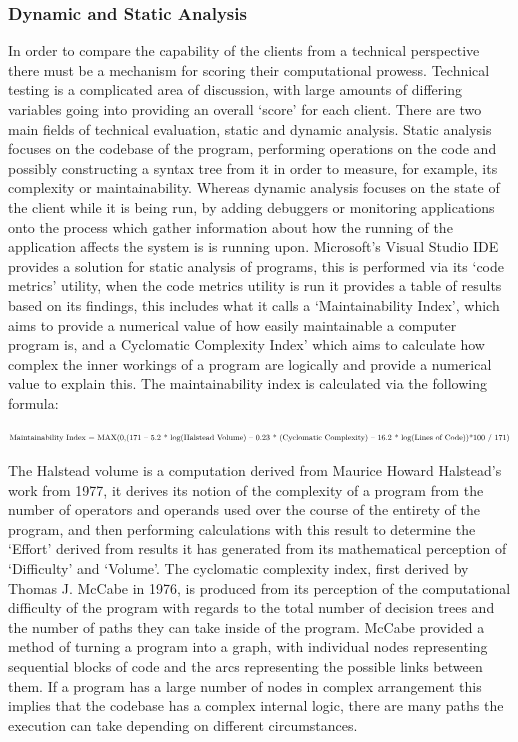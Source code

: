 \documentclass{article}
\begin{document}
	\subsubsection{Dynamic and Static Analysis}
	In order to compare the capability of the clients from a technical perspective there must be a mechanism for scoring their computational prowess. Technical testing is a complicated area of discussion, with large amounts of differing variables going into providing an overall ‘score’ for each client. There are two main fields of technical evaluation, static and dynamic analysis. Static analysis focuses on the codebase of the program, performing operations on the code and possibly constructing a syntax tree from it in order to measure, for example, its complexity or maintainability. Whereas dynamic analysis focuses on the state of the client while it is being run, by adding debuggers or monitoring applications onto the process which gather information about how the running of the application affects the system is is running upon. Microsoft’s Visual Studio IDE provides a solution for static analysis of programs, this is performed via its ‘code metrics’ utility, when the code metrics utility is run it provides a table of results based on its findings, this includes what it calls a ‘Maintainability Index’, which aims to provide a numerical value of how easily maintainable a computer program is, and a Cyclomatic Complexity Index’ which aims to calculate how complex the inner workings of a program are logically and provide a numerical value to explain this. The maintainability index is calculated via the following formula: 
	\begin{center}
	\begin{equation}
	\resizebox{1.1\hsize}{!}{Maintainability Index = MAX(0,(171 – 5.2 * log(Halstead Volume) – 0.23 * (Cyclomatic Complexity) – 16.2 * log(Lines of Code))*100 / 171)}
	\end{equation}
	\end{center}
	
	The Halstead volume is a computation derived from Maurice Howard Halstead’s work from 1977\cite{Halstead:1977:ESS:540137}, it derives its notion of the complexity of a program from the number of operators and operands used over the course of the entirety of the program, and then performing calculations with this result to determine the ‘Effort’ derived from results it has generated from its mathematical perception of ‘Difficulty’ and ‘Volume’. The cyclomatic complexity index, first derived by Thomas J. McCabe\cite{McCabe:1976:CM:1313324.1313586} in 1976, is produced from its perception of the computational difficulty of the program with regards to the total number of decision trees and the number of paths they can take inside of the program. McCabe provided a method of turning a program into a graph, with individual nodes representing sequential blocks of code and the arcs representing the possible links between them. If a program has a large number of nodes in complex arrangement this implies that the codebase has a complex internal logic, there are many paths the execution can take depending on different circumstances.
	
\end{document}
